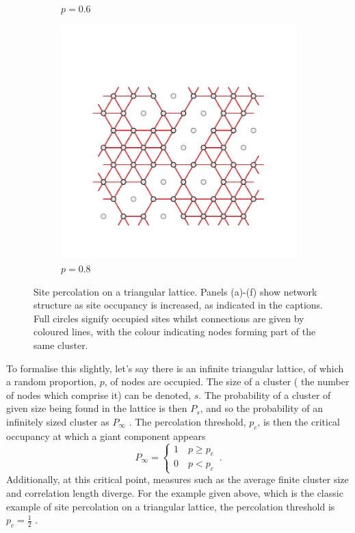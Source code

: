 \begin{figure}[bt]
\begin{subfigure}[b]{0.3\textwidth}
         \caption{$p=0.6$}
         \label{fig:perctri6}
     \end{subfigure}
     \hfill
      \begin{subfigure}[b]{0.3\textwidth}
         \centering
         \includegraphics[width=\textwidth]{./figures/targeted_opt/perc_tri_8.pdf}
         \caption{$p=0.8$}
         \label{fig:perctri8}
     \end{subfigure}
     \hfill
     
     \caption{Site percolation on a triangular lattice. Panels (a)\--(f) show network structure as site occupancy is increased, as indicated in the captions. Full circles signify occupied sites whilst connections are given by coloured lines, with the colour indicating nodes forming part of the same cluster.}
     \label{fig:perctri}
\end{figure}

To formalise this slightly, let's say there is an infinite triangular lattice, of which a random proportion, $p$, of nodes are occupied.
The size of a cluster (\ie{} the number of nodes which comprise it) can be denoted, $s$. 
The probability of a cluster of given size being found in the lattice is then $P_s$, and so the probability of an infinitely sized cluster as $P_{\infty}$ \cite{StaufferDietrich2014}.
The percolation threshold, $p_c$, is then the critical occupancy at which a giant component appears \ie{}
\begin{equation}
	P_{\infty}=\begin{cases} 1 \quad p\geq p_c \\
							0 \quad p<p_c
	\end{cases}\,.
\end{equation}
Additionally, at this critical point, measures such as the average finite cluster size and correlation length diverge.
For the example given above, which is the classic example of site percolation on a triangular lattice, the percolation threshold is $p_c=\frac{1}{2}$  \cite{Sykes1964}.

